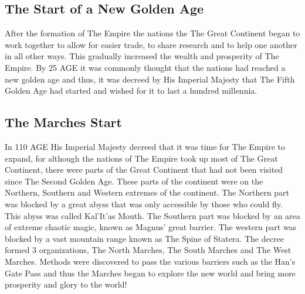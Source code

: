 \subsection{The Start of a New Golden Age}
After the formation of The Empire the nations the The Great Continent began to work together to allow for easier trade, to share research and to help one another in all other ways. This gradually increased the wealth and prosperity of The Empire. By 25 AGE it was commonly thought that the nations had reached a new golden age and thus, it was decreed by His Imperial Majesty that The Fifth Golden Age had started and wished for it to last a hundred millennia.
\subsection{The Marches Start}
In 110 AGE His Imperial Majesty decreed that it was time for The Empire to expand, for although the nations of The Empire took up most of The Great Continent, there were parts of the Great Continent that had not been visited since The Second Golden Age. These parts of the continent were on the Northern, Southern and Western extremes of the continent. The Northern part was blocked by a great abyss that was only accessible by those who could fly. This abyss was called Kal'It'as Mouth. The Southern part was blocked by an area of extreme chaotic magic, known as Magnus' great barrier. The western part was blocked by a vast mountain range known as The Spine of Statera. \newline
The decree formed 3 organizations, The North Marches, The South Marches and The West Marches. Methods were discovered to pass the various barriers such as the Han's Gate Pass and thus the Marches began to explore the new world and bring more prosperity and glory to the world!